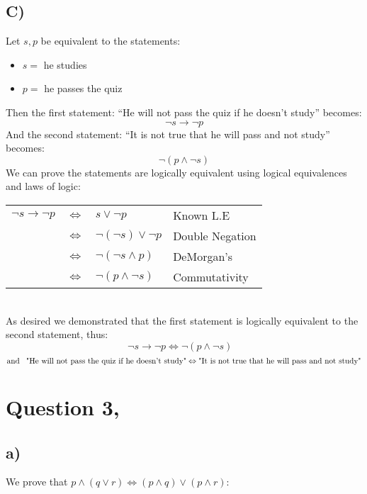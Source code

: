 \documentclass{article}
\begin{document}
\subsection*{C)}
Let $s,p$ be equivalent to the statements:
\begin{itemize}
    \item $s = $ he studies
    \item $p = $ he passes the quiz
\end{itemize}
Then the first statement:  “He will not pass the quiz if he doesn’t study” becomes:$$\lnot s \rightarrow \lnot p$$
And the second statement: “It is not true that he will pass and not study” becomes: $$\lnot(p\land\lnot s)$$
We can prove the statements are logically equivalent using logical equivalences and laws of logic:

\begin{table}[htp]
    \centering
    \begin{tabular}{ccll}
     $\lnot s \rightarrow \lnot p$ & $\Leftrightarrow$ & $s \lor \lnot p$ & Known L.E\\
     & $\Leftrightarrow$ & $\lnot (\lnot s) \lor \lnot p$ & Double Negation\\
     & $\Leftrightarrow$ & $\lnot(\lnot s \land p)$ & DeMorgan's\\
     & $\Leftrightarrow$ & $\lnot(p \land \lnot s)$ & Commutativity
    \end{tabular}
\end{table}

 \\As desired we demonstrated that the first statement is logically equivalent to the second statement, thus: $$\lnot s \rightarrow \lnot p\Leftrightarrow \lnot(p\land\lnot s)\;\;\;$$$$\\\text{and}\;\;\;\text{"He will not pass the quiz if he doesn’t study"}\Leftrightarrow\text{"It is not true that he will pass and not study"}$$





\newpage
\section*{Question 3,}
\subsection*{a)}
We prove that $p \land (q \lor r) \Leftrightarrow (p \land q) \lor (p \land r)$:
\end{document}
